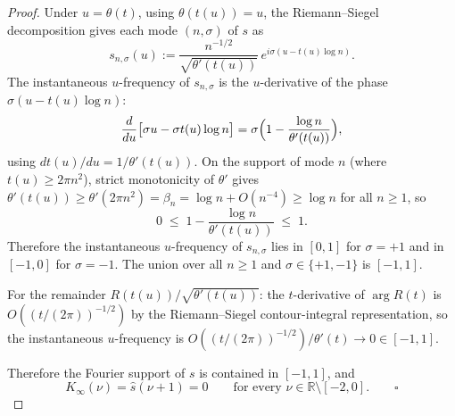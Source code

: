 \documentclass[12pt]{article}
\begin{document}
\begin{proof}
Under $u=\theta(t)$, using $\theta(t(u))=u$, the Riemann--Siegel decomposition gives each mode $(n,\sigma)$ of $s$ as
\begin{equation}
s_{n,\sigma}(u) := \frac{n^{-1/2}}{\sqrt{\theta'(t(u))}}\,e^{i\sigma(u - t(u)\log n)}.
\end{equation}
The instantaneous $u$-frequency of $s_{n,\sigma}$ is the $u$-derivative of the phase $\sigma(u - t(u)\log n)$:
\begin{equation}
\frac{d}{du}\bigl[\sigma u - \sigma t(u)\log n\bigr] = \sigma\Bigl(1 - \frac{\log n}{\theta'(t(u))}\Bigr),
\end{equation}
using $dt(u)/du = 1/\theta'(t(u))$. On the support of mode $n$ (where $t(u)\ge 2\pi n^2$), strict monotonicity of $\theta'$ gives $\theta'(t(u))\ge\theta'(2\pi n^2)=\beta_n=\log n+O(n^{-4})\ge\log n$ for all $n\ge 1$, so
\begin{equation}
0 \;\le\; 1 - \frac{\log n}{\theta'(t(u))} \;\le\; 1.
\end{equation}
Therefore the instantaneous $u$-frequency of $s_{n,\sigma}$ lies in $[0,1]$ for $\sigma=+1$ and in $[-1,0]$ for $\sigma=-1$. The union over all $n\ge 1$ and $\sigma\in\{+1,-1\}$ is $[-1,1]$.

For the remainder $R(t(u))/\sqrt{\theta'(t(u))}$: the $t$-derivative of $\arg R(t)$ is $O((t/(2\pi))^{-1/2})$ by the Riemann--Siegel contour-integral representation, so the instantaneous $u$-frequency is $O((t/(2\pi))^{-1/2})/\theta'(t)\to 0\in[-1,1]$.

Therefore the Fourier support of $s$ is contained in $[-1,1]$, and
\begin{equation}
K_\infty(\nu) = \hat{s}(\nu+1) = 0 \qquad \text{for every } \nu\in\mathbb{R}\setminus[-2,0]. \qquad \square
\end{equation}
\end{proof}
\end{document}
